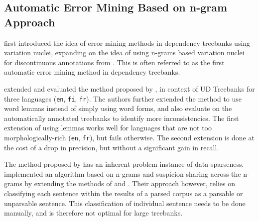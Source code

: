 \subsection{Automatic Error Mining Based on n-gram Approach}

\cite{boyd} first introduced the idea of error mining methods in dependency treebanks using variation nuclei, expanding on the idea of using n-grams based variation nuclei for discontinuous annotations from \cite{dickinson05}. This is often referred to as the first automatic error mining method in dependency treebanks.

\cite{de2017assessing} extended and evaluated the method proposed by \citeauthor{boyd}, in context of UD Treebanks for three languages (\verb|en|, \verb|fi|, \verb|fr|). The authors further extended the method to use word lemmas instead of simply using word forms, and also evaluate on the automatically annotated treebanks to identify more inconsistencies. The first extension of using lemmas works well for languages that are not too morphologically-rich (\verb|en|, \verb|fr|), but fails otherwise. The second extension is done at the cost of a drop in precision, but without a significant gain in recall.

The method proposed by \citeauthor{boyd} has an inherent problem instance of data sparseness. \cite{kook} implemented an algorithm based on n-grams and suspicion sharing across the n-grams by extending the methods of \cite{sagot} and \cite{noord}. Their approach however, relies on classifying each sentence within the results of a parsed corpus as a parsable or unparsable sentence. This classification of individual sentence needs to be done manually, and is therefore not optimal for large treebanks.

\newpage
